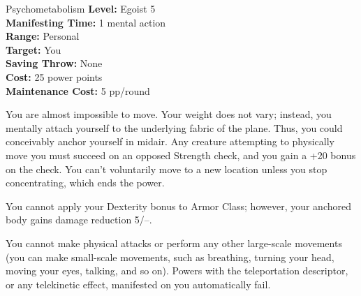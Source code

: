 {Psychometabolism}
{
	\textbf{Level:}
	Egoist 5\\
	\textbf{Manifesting Time:}
	1 mental action\\
	\textbf{Range:}
	Personal\\
	\textbf{Target:}
	You\\
	\textbf{Saving Throw:}
	None\\
	\textbf{Cost:}
	25 power points\\
	\textbf{Maintenance Cost:}
	5 pp/round\\
}
{
	You are almost impossible to move. Your weight does not vary; instead, you mentally attach yourself to the underlying fabric of the plane. Thus, you could conceivably anchor yourself in midair. Any creature attempting to physically move you must succeed on an opposed Strength check, and you gain a +20 bonus on the check. You can't voluntarily move to a new location unless you stop concentrating, which ends the power.

	You cannot apply your Dexterity bonus to Armor Class; however, your anchored body gains damage reduction 5/--.

	You cannot make physical attacks or perform any other large-scale movements (you can make small-scale movements, such as breathing, turning your head, moving your eyes, talking, and so on). Powers with the teleportation descriptor, or any telekinetic effect, manifested on you automatically fail.
}